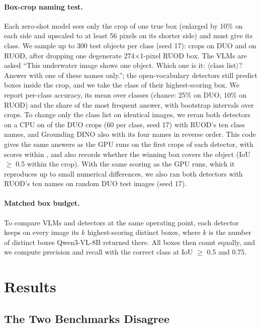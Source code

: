 \documentclass[letterpaper]{article} %
\begin{document}
\paragraph{Box-crop naming test.}
Each zero-shot model sees only the crop of one true box (enlarged by 10\% on each side and upscaled to at least 56 pixels on its shorter side) and must give its class. We sample up to 300 test objects per class (seed 17): \nCrops{} crops on DUO and \rCrops{} on RUOD, after dropping one degenerate 274$\times$1-pixel RUOD box. The VLMs are asked ``This underwater image shows one object. Which one is it: $\langle$class list$\rangle$? Answer with one of these names only.''; the open-vocabulary detectors still predict boxes inside the crop, and we take the class of their highest-scoring box. We report per-class accuracy, its mean over classes (chance: 25\% on DUO, 10\% on RUOD) and the share of the most frequent answer, with bootstrap intervals over crops. To change only the class list on identical images, we reran both detectors on a CPU on \vCrops{} of the DUO crops (60 per class, seed 17) with RUOD's ten class names, and Grounding DINO also with its four names in reverse order. This code gives the same answers as the GPU runs on the first \vReproCrops{} crops of each detector, with scores within \vReproDiff, and also records whether the winning box covers the object (IoU $\geq$ 0.5 within the crop). With the same scoring as the GPU runs, which it reproduces up to small numerical differences, we also ran both detectors with RUOD's ten names on \fvImages{} random DUO test images (seed 17).

\paragraph{Matched box budget.}
To compare VLMs and detectors at the same operating point, each detector keeps on every image its $k$ highest-scoring distinct boxes, where $k$ is the number of distinct boxes Qwen3-VL-8B returned there. All boxes then count equally, and we compute precision and recall with the correct class at IoU $\geq$ 0.5 and 0.75.

\section{Results}



\subsection{The Two Benchmarks Disagree}
\label{sec:gap}
\end{document}
